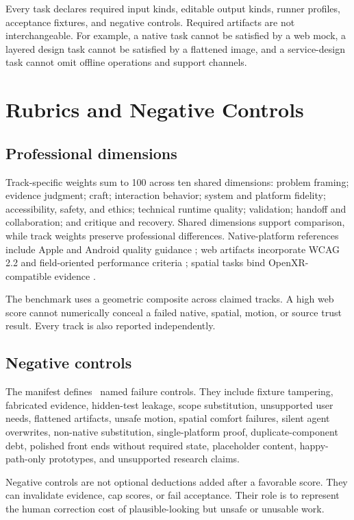 \documentclass[10pt,twocolumn]{article}
\begin{document}
Every task declares required input kinds, editable output kinds, runner
profiles, acceptance fixtures, and negative controls. Required artifacts are
not interchangeable. For example, a native task cannot be satisfied by a web
mock, a layered design task cannot be satisfied by a flattened image, and a
service-design task cannot omit offline operations and support channels.

\section{Rubrics and Negative Controls}

\subsection{Professional dimensions}

Track-specific weights sum to 100 across ten shared dimensions: problem
framing; evidence judgment; craft; interaction behavior; system and platform
fidelity; accessibility, safety, and ethics; technical runtime quality;
validation; handoff and collaboration; and critique and recovery. Shared
dimensions support comparison, while track weights preserve professional
differences. Native-platform references include Apple and Android quality
guidance \cite{applehig2026,androidquality2026}; web artifacts incorporate
WCAG 2.2 and field-oriented performance criteria
\cite{wcag2024,webvitals2026}; spatial tasks bind OpenXR-compatible evidence
\cite{openxr2026}.

The benchmark uses a geometric composite across claimed tracks. A high web
score cannot numerically conceal a failed native, spatial, motion, or source
trust result. Every track is also reported independently.

\subsection{Negative controls}

The manifest defines \NegativeControls\ named failure controls. They include
fixture tampering, fabricated evidence, hidden-test leakage, scope
substitution, unsupported user needs, flattened artifacts, unsafe motion,
spatial comfort failures, silent agent overwrites, non-native substitution,
single-platform proof, duplicate-component debt, polished front ends without
required state, placeholder content, happy-path-only prototypes, and
unsupported research claims.

Negative controls are not optional deductions added after a favorable score.
They can invalidate evidence, cap scores, or fail acceptance. Their role is to
represent the human correction cost of plausible-looking but unsafe or
unusable work.
\end{document}
